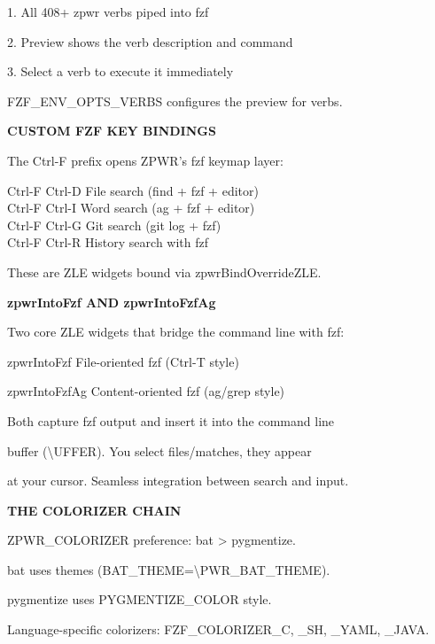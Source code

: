 \documentclass[11pt,a4paper,twoside]{book}
\begin{document}
1. All 408+ zpwr verbs piped into fzf

2. Preview shows the verb description and command

3. Select a verb to execute it immediately

FZF\_ENV\_OPTS\_VERBS configures the preview for verbs.


\vspace{12pt}
{\bfseries\color{neonyellow} CUSTOM FZF KEY BINDINGS}\vspace{4pt}

The Ctrl-F prefix opens ZPWR's fzf keymap layer:

\begin{codebox}
Ctrl-F Ctrl-D   File search (find + fzf + editor)\\
Ctrl-F Ctrl-I   Word search (ag + fzf + editor)\\
Ctrl-F Ctrl-G   Git search (git log + fzf)\\
Ctrl-F Ctrl-R   History search with fzf\\
\end{codebox}

These are ZLE widgets bound via zpwrBindOverrideZLE.


\vspace{12pt}
{\bfseries\color{neonyellow} zpwrIntoFzf AND zpwrIntoFzfAg}\vspace{4pt}

Two core ZLE widgets that bridge the command line with fzf:

zpwrIntoFzf     File-oriented fzf (Ctrl-T style)

zpwrIntoFzfAg   Content-oriented fzf (ag/grep style)

Both capture fzf output and insert it into the command line

buffer (\textbackslash{}UFFER). You select files/matches, they appear

at your cursor. Seamless integration between search and input.


\vspace{12pt}
{\bfseries\color{neonyellow} THE COLORIZER CHAIN}\vspace{4pt}

ZPWR\_COLORIZER preference: bat > pygmentize.

bat uses themes (BAT\_THEME=\textbackslash{}PWR\_BAT\_THEME).

pygmentize uses PYGMENTIZE\_COLOR style.

Language-specific colorizers: FZF\_COLORIZER\_C, \_SH, \_YAML, \_JAVA.
\end{document}
